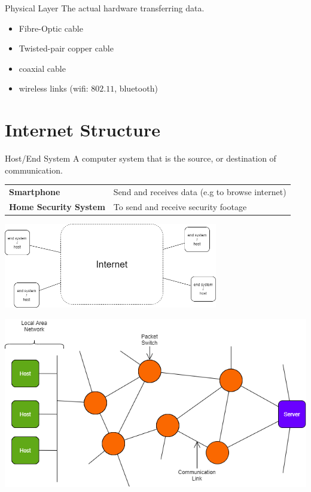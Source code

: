 \begin{definitionbox}{Physical Layer}
    The actual hardware transferring data.
    \begin{itemize}
        \setlength\itemsep{0em}
        \item Fibre-Optic cable
        \item Twisted-pair copper cable
        \item coaxial cable
        \item wireless links (wifi: $802.11$, bluetooth)
    \end{itemize}
\end{definitionbox}

\section{Internet Structure}

\begin{definitionbox}{Host/End System}
    A computer system that is the source, or destination of communication.

    \begin{tabular}{l p{}}
        \textbf{Smartphone}           & Send and receives data (e.g to browse internet) \\
        \textbf{Home Security System} & To send and receive security footage            \\
    \end{tabular}

    \begin{center}\includegraphics[width=0.7\textwidth]{basic_concepts_and_osi/images/host.png}\end{center}
\end{definitionbox}

\begin{center}\includegraphics[width=\textwidth]{basic_concepts_and_osi/images/basic internet structure.png}\end{center}

